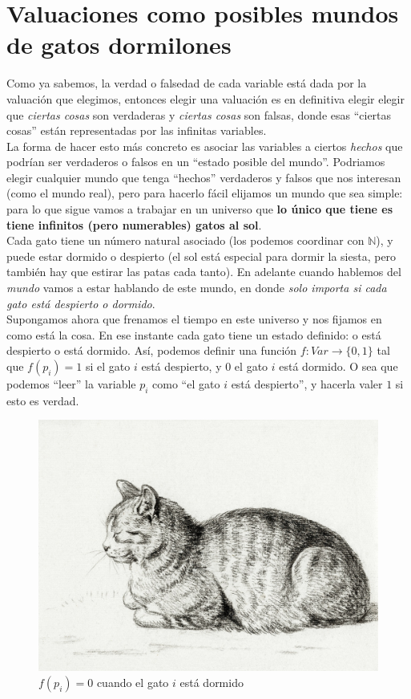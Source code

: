 \documentclass[10pt,a4paper]{article}
\newcommand{\N}{\mathbb{N}}
\newcommand{\ra}{\rightarrow}
\begin{document}
\section*{Valuaciones como posibles mundos de gatos dormilones}


Como ya sabemos, la verdad o falsedad de cada variable está dada por la valuación que elegimos, entonces elegir una valuación es en definitiva elegir elegir que \textit{ciertas cosas} son verdaderas y \textit{ciertas cosas}  son falsas, donde esas ``ciertas cosas'' están representadas por las infinitas variables.\\

La forma de hacer esto más concreto es asociar las variables a ciertos \textit{hechos} que podrían ser verdaderos o falsos en un  ``estado posible del mundo''. Podriamos elegir cualquier mundo que tenga ``hechos'' verdaderos y falsos que nos interesan (como el mundo real), pero para hacerlo fácil elijamos un mundo que sea simple: para lo que sigue vamos a trabajar en un universo que \textbf{lo único que tiene es tiene infinitos (pero numerables) gatos al sol}.\\

Cada gato tiene un número natural asociado (los podemos coordinar con $\N$), y puede estar dormido o despierto (el sol está especial para dormir la siesta, pero también hay que estirar las patas cada tanto).  En adelante cuando hablemos del \textit{mundo} vamos a estar hablando de este mundo, en donde \textit{solo importa si cada gato está despierto o dormido}. \\

Supongamos ahora que frenamos el tiempo en este universo y nos fijamos en como está la cosa. En ese instante cada gato tiene un estado definido: o está despierto o está dormido. Así, podemos definir una función $f: Var \ra \{0,1\}$ tal que $f(p_i) = 1$ si el gato $i$ está despierto, y $0$ el gato $i$ está dormido. O sea que podemos ``leer'' la variable $p_i$ como ``el gato $i$ está despierto'', y hacerla valer $1$ si esto es verdad. \\


\begin{figure}[h!]
\centering
\includegraphics[scale=0.15]{gato}
\caption{$f(p_i) = 0$ cuando el gato $i$ está dormido}
\end{figure}
\end{document}
